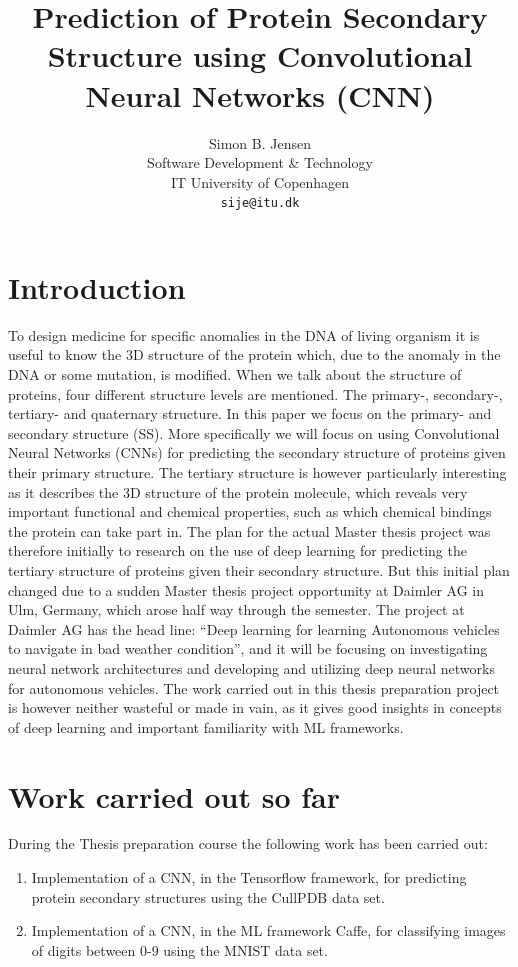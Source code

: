 \documentclass{article}
\title{Prediction of Protein Secondary Structure using Convolutional Neural Networks (CNN)}
\author{
  Simon B. Jensen\\
  Software Development \& Technology\\
  IT University of Copenhagen\\
  \texttt{sije@itu.dk} \\
}
\begin{document}

\maketitle

\section{Introduction}
\label{sec:introduction}
To design medicine for specific anomalies in the DNA of living organism it is useful to know the 3D structure of the protein which, due to the anomaly in the DNA or some mutation, is modified. When we talk about the structure of proteins, four different structure levels are mentioned. The primary-, secondary-, tertiary- and quaternary structure. In this paper we focus on the primary- and secondary structure (SS). More specifically we will focus on using Convolutional Neural Networks (CNNs) for predicting the secondary structure of proteins given their primary structure. The tertiary structure is however particularly interesting as it describes the 3D structure of the protein molecule, which reveals very important functional and chemical properties, such as which chemical bindings the protein can take part in. The plan for the actual Master thesis project was therefore initially to research on the use of deep learning for predicting the tertiary structure of proteins given their secondary structure. But this initial plan changed due to a sudden Master thesis project opportunity at Daimler AG in Ulm, Germany, which arose half way through the semester. The project at Daimler AG has the head line: ``Deep learning for learning Autonomous vehicles to navigate in bad weather condition'', and it will be focusing on investigating neural network architectures and developing and utilizing deep neural networks for autonomous vehicles. The work carried out in this thesis preparation project is however neither wasteful or made in vain, as it gives good insights in concepts of deep learning and important familiarity with ML frameworks.     

\section{Work carried out so far} 
During the Thesis preparation course the following work has been carried out:
\begin{enumerate}
\itemsep0em 
\item Implementation of a CNN, in the Tensorflow framework, for predicting protein secondary structures using the CullPDB data set.
\item Implementation of a CNN, in the ML framework Caffe, for classifying images of digits between 0-9 using the MNIST data set.
\end{enumerate}
\end{document}
